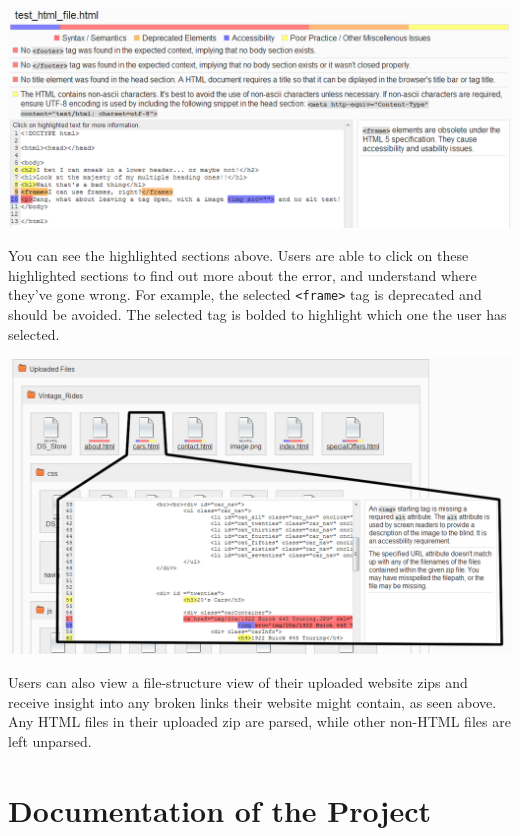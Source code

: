 \documentclass[10pt]{article}
\begin{document}
\begin{center}
\includegraphics[scale=0.3]{output_highlighting.png}
\end{center}

You can see the highlighted sections above. Users are able to click on these highlighted sections to find out more about the error, and understand where they've gone wrong. For example, the selected \verb+<frame>+ tag is deprecated and should be avoided. The selected tag is bolded to highlight which one the user has selected.

\begin{center}
\includegraphics[scale=0.25]{file_and_broken_link.png}
\end{center}

Users can also view a file-structure view of their uploaded website zips and receive insight into any broken links their website might contain, as seen above. Any HTML files in their uploaded zip are parsed, while other non-HTML files are left unparsed.

\section*{Documentation of the Project}
\end{document}
